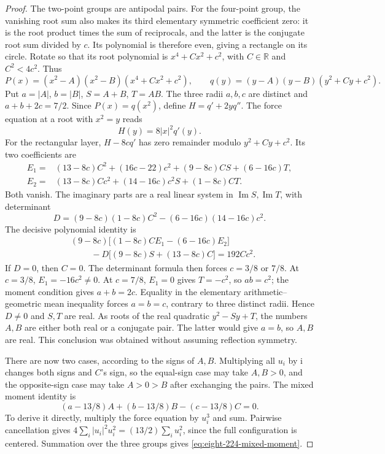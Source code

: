 \documentclass[11pt]{article}
\theoremstyle{remark}
\newcommand{\R}{\mathbb R}
\numberwithin{equation}{section}
\begin{document}
\begin{proof}
The two-point groups are antipodal pairs. For the four-point group,
the vanishing root sum also makes its third elementary symmetric
coefficient zero: it is the root product times the sum of reciprocals,
and the latter is the conjugate root sum divided by $c$. Its polynomial
is therefore even, giving a rectangle on its circle. Rotate so that its root polynomial is
$x^4+Cx^2+c^2$, with $C\in\R$ and $C^2<4c^2$. Thus
\[
 P(x)=(x^2-A)(x^2-B)(x^4+Cx^2+c^2),\qquad
 q(y)=(y-A)(y-B)(y^2+Cy+c^2).
\]
Put $a=|A|$, $b=|B|$, $S=A+B$, $T=AB$.
The three radii $a,b,c$ are distinct and
$a+b+2c=7/2$.
Since $P(x)=q(x^2)$, define $H=q'+2yq''$.
The force equation at a root with $x^2=y$ reads
\[
                      H(y)=8|x|^2q'(y).
\]
For the rectangular layer, $H-8cq'$ has zero remainder modulo
$y^2+Cy+c^2$. Its two coefficients are
\begin{align*}
E_1={}&(13-8c)C^2+(16c-22)c^2+(9-8c)CS+(6-16c)T,\\
E_2={}&(13-8c)Cc^2+(14-16c)c^2S+(1-8c)CT.
\end{align*}
Both vanish. The imaginary parts are a real linear system in
$\operatorname{Im}S,\operatorname{Im}T$, with determinant
\[
 D=(9-8c)(1-8c)C^2-(6-16c)(14-16c)c^2.
\]
The decisive polynomial identity is
\begin{align*}
 &(9-8c)\bigl[(1-8c)CE_1-(6-16c)E_2\bigr]\\
 &\hspace{1cm}-D\bigl[(9-8c)S+(13-8c)C\bigr]=192Cc^2.
\end{align*}
If $D=0$, then $C=0$. The determinant formula then forces
$c=3/8$ or $7/8$. At $c=3/8$, $E_1=-16c^2\ne0$.
At $c=7/8$, $E_1=0$ gives $T=-c^2$, so $ab=c^2$; the moment
condition gives $a+b=2c$. Equality in the elementary arithmetic--
geometric mean inequality forces $a=b=c$, contrary to three distinct
radii. Hence $D\ne0$ and $S,T$ are real. As roots of the real
quadratic $y^2-Sy+T$, the numbers $A,B$ are either both real or a
conjugate pair. The latter would give $a=b$, so $A,B$ are real.
This conclusion was obtained without assuming reflection symmetry.

There are now two cases, according to the signs of $A,B$.
Multiplying all $u_i$ by $\mathrm i$ changes both signs and $C$'s
sign, so the equal-sign case may take $A,B>0$, and the opposite-sign
case may take $A>0>B$ after exchanging the pairs.
The mixed moment identity is
\begin{equation}\label{eq:eight-224-mixed-moment}
 (a-13/8)A+(b-13/8)B-(c-13/8)C=0.
\end{equation}
To derive it directly, multiply the force equation by $u_i^3$ and
sum. Pairwise cancellation gives
$4\sum_i|u_i|^2u_i^2=(13/2)\sum_i u_i^2$, since the full
configuration is centered. Summation over the three groups gives
\eqref{eq:eight-224-mixed-moment}.


\end{proof}
\end{document}
